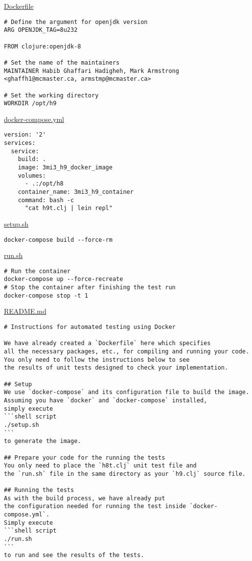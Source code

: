 \documentclass[11pt]{article}
\begin{document}
\href{./testing/h9/Dockerfile}{Dockerfile}
\begin{verbatim}
# Define the argument for openjdk version
ARG OPENJDK_TAG=8u232

FROM clojure:openjdk-8
    
# Set the name of the maintainers
MAINTAINER Habib Ghaffari Hadigheh, Mark Armstrong <ghaffh1@mcmaster.ca, armstmp@mcmaster.ca>

# Set the working directory
WORKDIR /opt/h9
\end{verbatim}

\href{./testing/h9/docker-compose.yml}{docker-compose.yml}
\begin{verbatim}
version: '2'
services:
  service:
    build: .
    image: 3mi3_h9_docker_image
    volumes:
      - .:/opt/h8
    container_name: 3mi3_h9_container
    command: bash -c
      "cat h9t.clj | lein repl"
\end{verbatim}

\href{./testing/h9/setup.sh}{setup.sh}
\begin{verbatim}
docker-compose build --force-rm
\end{verbatim}

\href{./testing/h9/run.sh}{run.sh}
\begin{verbatim}
# Run the container
docker-compose up --force-recreate
# Stop the container after finishing the test run
docker-compose stop -t 1
\end{verbatim}

\href{./testing/h9/README.md}{README.md}
\begin{verbatim}
# Instructions for automated testing using Docker

We have already created a `Dockerfile` here which specifies
all the necessary packages, etc., for compiling and running your code.
You only need to follow the instructions below to see 
the results of unit tests designed to check your implementation.

## Setup
We use `docker-compose` and its configuration file to build the image.
Assuming you have `docker` and `docker-compose` installed,
simply execute
```shell script
./setup.sh
```
to generate the image.

## Prepare your code for the running the tests
You only need to place the `h8t.clj` unit test file and
the `run.sh` file in the same directory as your `h9.clj` source file.

## Running the tests
As with the build process, we have already put
the configuration needed for running the test inside `docker-compose.yml`.
Simply execute
```shell script
./run.sh
```
to run and see the results of the tests.
\end{verbatim}
\end{document}
